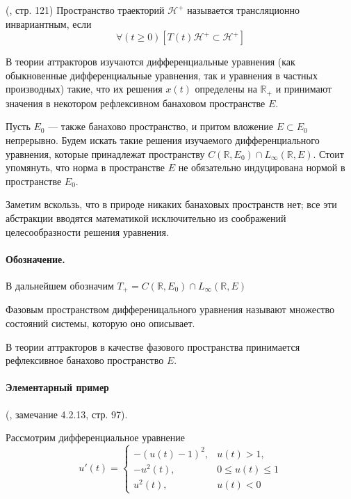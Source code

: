 \opred (\cite{Zelenaya}, стр. 121)
Пространство траекторий $\mathcal{H}^+$ называется трансляционно инвариантным, если
$$
\forall(t \geq 0)\left[T(t)\mathcal{H}^+ \subset \mathcal{H}^+ \right]
$$


В теории аттракторов изучаются дифференциальные уравнения (как обыкновенные дифференциальные уравнения, так и уравнения в частных производных) такие, что их решения $x(t)$ определены на $\mathbb{R}_+$ и принимают значения в некотором рефлексивном банаховом пространстве $E$.

Пусть $E_0$ --- также банахово пространство, и притом вложение $E \subset E_0$ непрерывно.
Будем искать такие решения изучаемого дифференциального уравнения, которые принадлежат пространству $C(\mathbb{R},E_0) \cap L_\infty(\mathbb{R},E)$.
Стоит упомянуть, что норма в пространстве $E$ не обязательно индуцирована нормой в пространстве $E_0$.

Заметим вскользь, что в природе никаких банаховых пространств нет; все эти абстракции вводятся математикой исключительно из соображений целесообразности решения уравнения.

\paragraph{Обозначение.}
В дальнейшем обозначим $T_+ = C(\mathbb{R},E_0) \cap L_\infty(\mathbb{R},E)$

\opred
Фазовым пространством дифференицального уравнения называют множество состояний системы, которую оно описывает.

В теории аттракторов в качестве фазового пространства принимается рефлексивное банахово пространство $E$.


\paragraph{Элементарный пример} (\cite{Vorotnikov}, замечание 4.2.13, стр. 97).

Рассмотрим дифференциальное уравнение
\begin{equation}\label{primer_iz_statyi}
	u'(t)=
	\left\{
		\begin{array}{ll}
			-(u(t)-1)^2, & u(t) > 1, \\
			-u^2 (t)   , & 0 \leq u(t) \leq 1 \\
			u^2 (t)    , & u(t) < 0
		\end{array}
	\right.
\end{equation}

